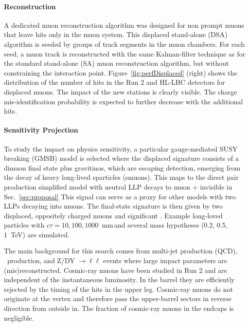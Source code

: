 \paragraph{Reconstruction}

A dedicated muon reconstruction algorithm was designed for non prompt muons that leave hits only in the muon system. 
This displaced stand-alone (DSA) algorithm is seeded by groups of track segments in the muon chambers. For each seed, a muon track is reconstructed with the same Kalman-filter technique as for the standard stand-alone (SA) muon reconstruction algorithm, 
but without constraining the interaction point.
Figure~\ref{fig:perfDisplaced} (right) shows the distribution of the number of hits in the Run 2 and HL-LHC detectors for displaced muons. The impact of the new stations is clearly visible. 
The charge mis-identification probability is expected to further decrease with the additional hits.



\paragraph{Sensitivity Projection}

To study the impact on physics sensitivity, a particular gauge-mediated SUSY breaking (GMSB) model is selected where
the displaced signature consists of a dimuon final state plus gravitinos, which are escaping detection, emerging from the decay of heavy long-lived sparticles (smuons). This maps to the direct pair production simplified model with neutral LLP decays to muon + invisible in Sec.~\ref{sec:proposal}
This signal can serve as a proxy for other models with two LLPs decaying into muons.
The final-state signature is then given by two displaced, oppositely charged muons 
and significant \met.
Example long-loved particles with $c\tau=10, 100, 1000$~mm\,and several mass hypotheses (0.2, 0.5, 1~TeV) are simulated.

The main background for this search comes from multi-jet production (QCD), \ttbar~production, 
and Z/DY $\to\ell\ell$ events  where large impact parameters are (mis)reconstructed. 
Cosmic-ray muons have been studied in Run 2 and are independent of the instantaneous luminosity.
In the barrel they are efficiently rejected by the timing of the hits in the upper leg. Cosmic-ray muons do not originate at the vertex and therefore pass the upper-barrel sectors in reverse 
direction from outside in. The fraction of cosmic-ray muons in the endcaps is negligible. 


